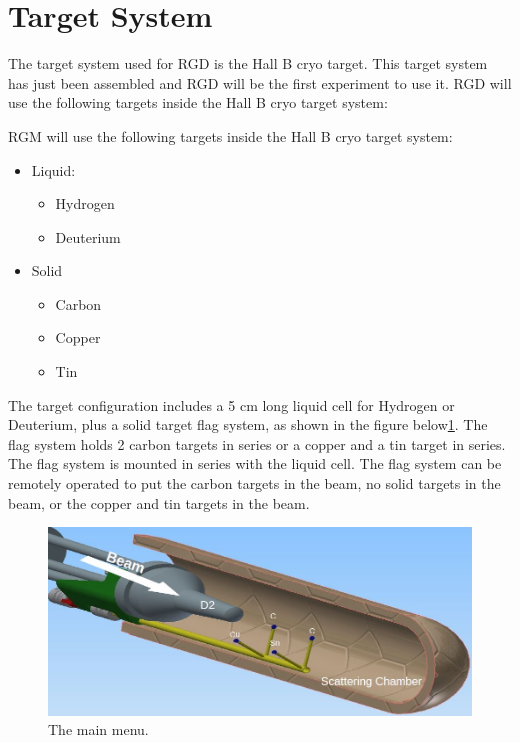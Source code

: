 \section{Target System}

The target system used for RGD is the Hall B cryo target. This target
system has just been assembled and RGD will be the first experiment to use it.
RGD will use the following targets inside the Hall B cryo target system:

RGM will use the following targets inside the Hall B cryo target system:
\begin{itemize}
\item	Liquid:
   \begin{itemize}
	\item	Hydrogen
	\item	Deuterium
    \end{itemize}
\item		Solid
   \begin{itemize}
	\item	Carbon
	\item	Copper
	\item	Tin
   \end{itemize}
\end{itemize}

The target configuration includes a 5 cm long liquid cell for Hydrogen or Deuterium, plus a solid target flag system, as shown in the figure below\ref{fig:rgd-target}.  The flag system holds 2 carbon targets in series or a copper and a tin target in series.  The flag system is mounted in series with the liquid cell.  The flag system can be remotely operated to put the carbon targets in the beam, no solid targets in the beam, or the copper and tin targets in the beam.

\begin{figure}\centering
  \includegraphics[width=\textwidth]{pics/rgd-target.jpg}
  \caption{The main menu.\label{fig:rgd-target}}
\end{figure}

